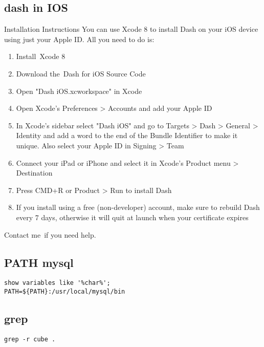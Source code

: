\documentclass[11pt]{article}
\begin{document}
\subsection{dash in IOS}
\label{sec:org3b48a59}
Installation Instructions
You can use Xcode 8 to install Dash on your iOS device using just your Apple ID.
All you need to do is:
\begin{enumerate}
\item Install Xcode 8
\item Download the Dash for iOS Source Code
\item Open "Dash iOS.xcworkspace" in Xcode
\item Open Xcode's Preferences > Accounts and add your Apple ID
\item In Xcode's sidebar select "Dash iOS" and go to Targets > Dash > General > Identity and add a word to the end of the Bundle Identifier to make it unique. Also select your Apple ID in Signing > Team
\item Connect your iPad or iPhone and select it in Xcode's Product menu > Destination
\item Press CMD+R or Product > Run to install Dash
\item If you install using a free (non-developer) account, make sure to rebuild Dash every 7 days, otherwise it will quit at launch when your certificate expires
\end{enumerate}
Contact me if you need help.
\subsection{PATH mysql}
\label{sec:org04b256d}
\begin{verbatim}
show variables like '%char%';
PATH=${PATH}:/usr/local/mysql/bin
\end{verbatim}
\subsection{grep}
\label{sec:orgfbcdde9}
\begin{verbatim}
grep -r cube .
\end{verbatim}
\end{document}
